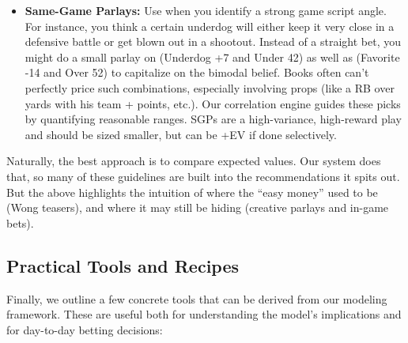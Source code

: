 \documentclass[12pt]{article}
\begin{document}
\begin{itemize}
    \item \textbf{Same-Game Parlays:} Use when you identify a strong game script angle. For instance, you think a certain underdog will either keep it very close in a defensive battle or get blown out in a shootout. Instead of a straight bet, you might do a small parlay on (Underdog +7 and Under 42) as well as (Favorite -14 and Over 52) to capitalize on the bimodal belief. Books often can’t perfectly price such combinations, especially involving props (like a RB over yards with his team + points, etc.). Our correlation engine guides these picks by quantifying reasonable ranges. SGPs are a high-variance, high-reward play and should be sized smaller, but can be +EV if done selectively.
\end{itemize}

Naturally, the best approach is to compare expected values. Our system does that, so many of these guidelines are built into the recommendations it spits out. But the above highlights the intuition of where the “easy money” used to be (Wong teasers), and where it may still be hiding (creative parlays and in-game bets).

\subsection{Practical Tools and Recipes}
Finally, we outline a few concrete tools that can be derived from our modeling framework. These are useful both for understanding the model’s implications and for day-to-day betting decisions:
\end{document}
